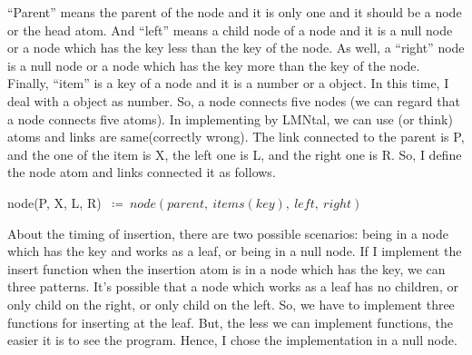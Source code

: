 \documentclass[dvipdfmx]{article}
\begin{document}
\begin{enumerate}
  ``Parent'' means the parent of the node and it is only one and it should be a node or the head atom. And ``left'' means a child node of a node and it is a null node or a node which has the key less than the  key of the node. As well, a ``right'' node is a null node or a node which has the key more than the key of the node. Finally, ``item'' is a key of a node and it is a number or a object. In this time, I deal with a object as number. So, a node connects five nodes (we can regard that a node connects five atoms). In implementing by LMNtal, we can use (or think) atoms and links are same(correctly wrong). The link connected to the parent is {\ttfamily P}, and the one of the item is {\ttfamily X}, the left one is {\ttfamily L}, and the right one is {\ttfamily R}. So, I define the node atom and links connected it as follows.
  \begin{center}
    {\ttfamily node(P, X, L, R)}  $\ \coloneqq \ node(parent,\ items(key),\ left,\ right)$
  \end{center}
  About the timing of insertion, there are two possible scenarios: being in a node which has the key and works as a leaf, or being in a null node. If I implement the insert function when the insertion atom is in a node which has the key, we can three patterns. It's possible that a node which works as a leaf has no children, or only child on the right, or only child on the left. So, we have to implement three functions for inserting at the leaf. But, the less we can implement functions, the easier it is to see the program. Hence, I chose the implementation in a null node.
  \begin{figure}[ht]
    \begin{multicols}{2}
      \begin{center}
      \end{center}
      \begin{center}
\end{center}
\end{multicols}
\end{figure}
\end{enumerate}
\end{document}
